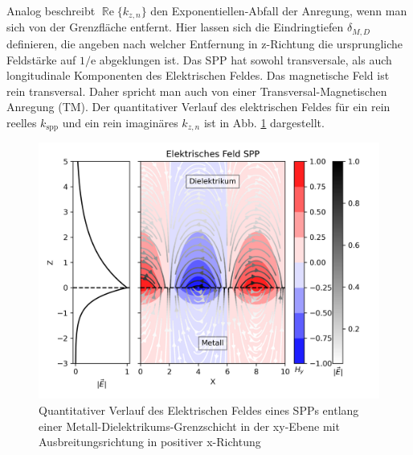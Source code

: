 \documentclass{article}
\begin{document}
	Analog beschreibt $\operatorname{\mathbb{R}e}\{k_{z, n}\}$ den Exponentiellen-Abfall der Anregung, wenn man sich von der Grenzfläche entfernt. Hier lassen sich die Eindringtiefen $\delta_{M,D}$ definieren, die angeben nach welcher Entfernung in z-Richtung die ursprungliche Feldstärke auf $1/\mathrm{e}$ abgeklungen ist. Das SPP hat sowohl transversale, als auch longitudinale Komponenten des Elektrischen Feldes. Das magnetische Feld ist rein transversal. Daher spricht man auch von einer Transversal-Magnetischen Anregung (TM).
	Der quantitativer Verlauf des elektrischen Feldes für ein rein reelles $k_{\mathrm{spp}}$ und ein rein imaginäres $k_{z, n}$ ist in Abb. \ref{fig:electric_field_spp} dargestellt.
	\begin{figure}[htbp] 
		\centering
		\includegraphics[width=1\textwidth]{figures/E_Feld_SPP.png}
		\caption{Quantitativer Verlauf des Elektrischen Feldes eines SPPs entlang einer Metall-Dielektrikums-Grenzschicht in der  xy-Ebene mit Ausbreitungsrichtung in positiver x-Richtung}
		\label{fig:electric_field_spp}
	\end{figure}
\end{document}
